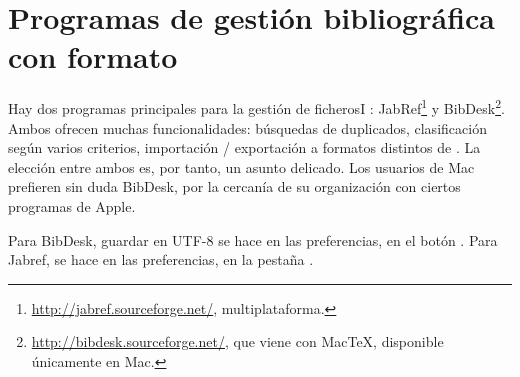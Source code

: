 \section{Programas de gestión bibliográfica con formato }\label{logicielbiblio}

Hay dos programas principales para la gestión de ficherosI : JabRef\footnote{\url{http://jabref.sourceforge.net/}, multiplataforma.} y BibDesk\footnote{\url{http://bibdesk.sourceforge.net/}, que viene con MacTeX, disponible únicamente en Mac.}. Ambos ofrecen muchas funcionalidades:  búsquedas de duplicados, clasificación según varios criterios, importación / exportación a formatos distintos de . La elección entre ambos es, por tanto, un asunto delicado. Los usuarios de Mac prefieren sin duda BibDesk, por la cercanía de su organización con ciertos programas de Apple. 

Para BibDesk, guardar en UTF-8 se hace en las preferencias, en el botón . Para  Jabref, se hace en las preferencias, en la pestaña .





